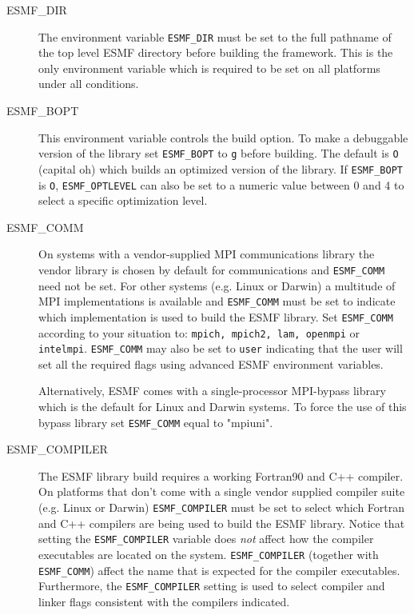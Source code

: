 \begin{description}

\item[ESMF\_DIR]
The environment variable {\tt ESMF\_DIR} must be set to the full pathname 
of the top level ESMF directory before building the framework.  This is the 
only environment variable which is required to be set on all platforms under 
all conditions.

\item[ESMF\_BOPT]
This environment variable controls the build option. To make a debuggable
version of the library set {\tt ESMF\_BOPT} to {\tt g} before building. The
default is {\tt O} (capital oh) which builds an optimized version of the 
library. If {\tt ESMF\_BOPT} is {\tt O}, {\tt ESMF\_OPTLEVEL} can also be set
to a numeric value between 0 and 4 to select a specific optimization level.

\item[ESMF\_COMM]
On systems with a vendor-supplied MPI communications library the vendor library 
is chosen by default for communications and {\tt ESMF\_COMM} need not be set.
For other systems (e.g. Linux or Darwin) a multitude of MPI implementations is
available and {\tt ESMF\_COMM} must be set to indicate which implementation is
used to build the ESMF library. Set {\tt ESMF\_COMM} according to your situation
to: {\tt mpich, mpich2, lam, openmpi} or {\tt intelmpi}. {\tt ESMF\_COMM} may
also be set to {\tt user} indicating that the user will set all the required
flags using advanced ESMF environment variables.

Alternatively, ESMF comes with a single-processor MPI-bypass library which is
the default for Linux and Darwin systems. To force the use of this bypass
library set {\tt ESMF\_COMM} equal to "mpiuni".

\item[ESMF\_COMPILER]
The ESMF library build requires a working Fortran90 and C++ compiler. On 
platforms that don't come with a single vendor supplied compiler suite
(e.g. Linux or Darwin) {\tt ESMF\_COMPILER} must be set to select which Fortran
and C++ compilers are being used to build the ESMF library. Notice that setting
the {\tt ESMF\_COMPILER} variable does {\em not} affect how the compiler
executables are located on the system. {\tt ESMF\_COMPILER} (together with
{\tt ESMF\_COMM}) affect the name that is expected for the compiler executables.
Furthermore, the {\tt ESMF\_COMPILER} setting is used to select compiler and
linker flags consistent with the compilers indicated.


\end{description}
